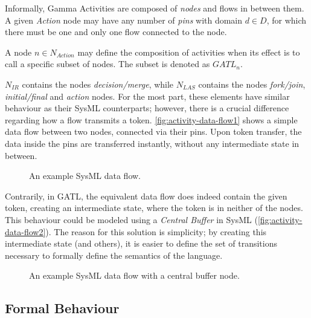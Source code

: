 \begin{definition}
Informally, Gamma Activities are composed of \emph{nodes} and flows in between them. A given  \emph{Action} node may have any number of \emph{pins} with domain \(d \in D\), for which there must be one and only one flow connected to the node.

A node \(n \in N_\mathit{Action}\) may define the composition of activities when its effect is to call a specific subset of nodes. The subset is denoted as \(\mathit{GATL}_\mathit{n}\).

\(N_\mathit{IR}\) contains the nodes \emph{decision/merge}, while \(N_\mathit{LAS}\) contains the nodes \emph{fork/join}, \mbox{\emph{initial/final}} and \emph{action} nodes. For the most part, these elements have similar behaviour as their SysML counterparts; however, there is a crucial difference regarding how a flow transmits a token. \autoref{fig:activity-data-flow1} shows a simple data flow between two nodes, connected via their pins. Upon token transfer, the data inside the pins are transferred instantly, without any intermediate state in between. 

\begin{figure}[!ht]
	\centering
	
	\caption{An example SysML data flow.}
	\label{fig:activity-data-flow1}
\end{figure}

Contrarily, in GATL, the equivalent data flow does indeed contain the given token, creating an intermediate state, where the token is in neither of the nodes. This behaviour could be modeled using a \emph{Central Buffer} in SysML (\autoref{fig:activity-data-flow2}). The reason for this solution is simplicity; by creating this intermediate state (and others), it is easier to define the set of transitions necessary to formally define the semantics of the language.

\begin{figure}[!ht]
	\centering
	
	\caption{An example SysML data flow with a central buffer node.}
	\label{fig:activity-data-flow2}
\end{figure}
	
\end{definition}\label{def:activity-structure}

\subsection{Formal Behaviour}


